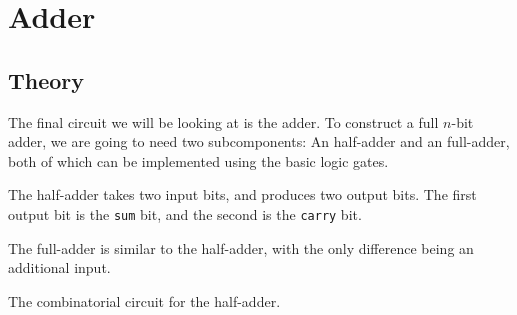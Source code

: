 \documentclass{beamer}
\renewcommand{\tt}{\texttt}
\begin{document}
\section{Adder}
\subsection{Theory}
\begin{frame}
    The final circuit we will be looking at is the adder. To construct a full
    $n$-bit adder, we are going to need two subcomponents: An half-adder and an
    full-adder, both of which can be implemented using the basic logic gates.

    \vspace{\baselineskip}
    The half-adder takes two input bits, and produces two output bits. The
    first output bit is the \tt{sum} bit, and the second is the \tt{carry} bit.

    \vspace{\baselineskip}
    The full-adder is similar to the half-adder, with the only difference
    being an additional input.
\end{frame}
\begin{frame}
    The combinatorial circuit for the half-adder.
    \begin{figure}
        \centering
        \label{fig:half-adder}
    \end{figure}
\end{frame}
\end{document}
